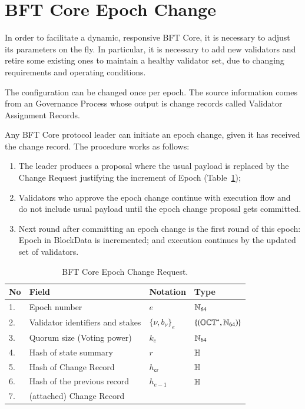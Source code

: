 \section{BFT Core Epoch Change}

In order to facilitate a dynamic, responsive BFT Core, it is necessary to adjust its parameters on the fly. In particular, it is necessary to add new validators and retire some existing ones to maintain a healthy validator set, due to changing requirements and operating conditions.

The configuration can be changed once per epoch. The source information comes from an Governance Process whose output is change records called Validator Assignment Records.

Any BFT Core protocol leader can initiate an epoch change, given it has received the change record. The procedure works as follows:

\begin{enumerate}
  \item The leader produces a proposal where the usual payload is replaced by the Change Request justifying the increment of Epoch (Table~\ref{ta:rc-ecr});
  \item Validators who approve the epoch change continue with execution flow and do not include usual payload until the epoch change proposal gets committed.
  \item Next round after committing an epoch change is the first round of this epoch: Epoch in BlockData is incremented; and execution continues by the updated set of validators.
\end{enumerate}

\begin{table}[!htbp]
	\begin{center}
		\caption{BFT Core Epoch Change Request.}\label{ta:rc-ecr}
		\begin{tabular}{|p{0.5cm}|p{8cm}|p{1.7cm}|p{3.5cm}|}\hline
			No & Field                          & Notation  & Type                  \\\hline\hline
			1. & Epoch number                   & $e$       & $\mathbb{N}_{64}$           \\\hline
			2. & Validator identifiers and stakes& $\{\nu, b_\nu\}_e$ & $\{ (\mathbb{OCT}^{\ast}, \mathbb{N}_{64}) \}$  \\\hline
			3. & Quorum size (Voting power)     & $k_e$     & $\mathbb{N}_{64}$           \\\hline
			4. & Hash of state summary          & $r$       & $\mathbb{H}$          \\\hline
			5. & Hash of Change Record         & $h_{\mathsf{cr}}$ & $\mathbb{H}$ \\\hline
			6. & Hash of the previous record    & $h_{e-1}$ & $\mathbb{H}$          \\\hline
			7. & (attached) Change Record      &           &   \\\hline
		\end{tabular}
	\end{center}
\end{table}

